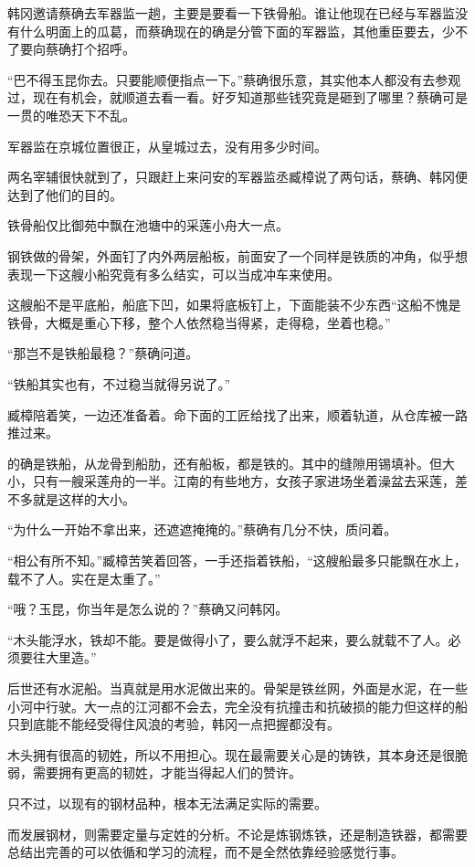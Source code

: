 韩冈邀请蔡确去军器监一趟，主要是要看一下铁骨船。谁让他现在已经与军器监没有什么明面上的瓜葛，而蔡确现在的确是分管下面的军器监，其他重臣要去，少不了要向蔡确打个招呼。

“巴不得玉昆你去。只要能顺便指点一下。”蔡确很乐意，其实他本人都没有去参观过，现在有机会，就顺道去看一看。好歹知道那些钱究竟是砸到了哪里？蔡确可是一贯的唯恐天下不乱。

军器监在京城位置很正，从皇城过去，没有用多少时间。

两名宰辅很快就到了，只跟赶上来问安的军器监丞臧樟说了两句话，蔡确、韩冈便达到了他们的目的。

铁骨船仅比御苑中飘在池塘中的采莲小舟大一点。

钢铁做的骨架，外面钉了内外两层船板，前面安了一个同样是铁质的冲角，似乎想表现一下这艘小船究竟有多么结实，可以当成冲车来使用。

这艘船不是平底船，船底下凹，如果将底板钉上，下面能装不少东西“这船不愧是铁骨，大概是重心下移，整个人依然稳当得紧，走得稳，坐着也稳。”

“那岂不是铁船最稳？”蔡确问道。

“铁船其实也有，不过稳当就得另说了。”

臧樟陪着笑，一边还准备着。命下面的工匠给找了出来，顺着轨道，从仓库被一路推过来。

的确是铁船，从龙骨到船肋，还有船板，都是铁的。其中的缝隙用锡填补。但大小，只有一艘采莲舟的一半。江南的有些地方，女孩子家进场坐着澡盆去采莲，差不多就是这样的大小。

“为什么一开始不拿出来，还遮遮掩掩的。”蔡确有几分不快，质问着。

“相公有所不知。”臧樟苦笑着回答，一手还指着铁船，“这艘船最多只能飘在水上，载不了人。实在是太重了。”

“哦？玉昆，你当年是怎么说的？”蔡确又问韩冈。

“木头能浮水，铁却不能。要是做得小了，要么就浮不起来，要么就载不了人。必须要往大里造。”

后世还有水泥船。当真就是用水泥做出来的。骨架是铁丝网，外面是水泥，在一些小河中行驶。大一点的江河都不会去，完全没有抗撞击和抗破损的能力但这样的船只到底能不能经受得住风浪的考验，韩冈一点把握都没有。

木头拥有很高的韧姓，所以不用担心。现在最需要关心是的铸铁，其本身还是很脆弱，需要拥有更高的韧姓，才能当得起人们的赞许。

只不过，以现有的钢材品种，根本无法满足实际的需要。

而发展钢材，则需要定量与定姓的分析。不论是炼钢炼铁，还是制造铁器，都需要总结出完善的可以依循和学习的流程，而不是全然依靠经验感觉行事。

